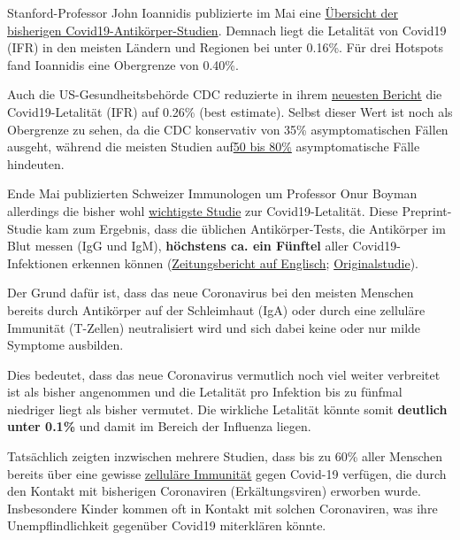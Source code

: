 Stanford-Professor John Ioannidis publizierte im Mai eine
\href{https://swprs.org/studies-on-covid-19-lethality/}{Übersicht der
bisherigen Covid19-Antikörper-Studien}. Demnach liegt die Letalität von
Covid19 (IFR) in den meisten Ländern und Regionen bei unter 0.16\%. Für
drei Hotspots fand Ioannidis eine Obergrenze von 0.40\%.

Auch die US-Gesundheitsbehörde CDC reduzierte in ihrem
\href{https://reason.com/2020/05/24/the-cdcs-new-best-estimate-implies-a-covid-19-infection-fatality-rate-below-0-3/}{neuesten
Bericht} die Covid19-Letalität (IFR) auf 0.26\% (best estimate). Selbst
dieser Wert ist noch als Obergrenze zu sehen, da die CDC konservativ von
35\% asymptomatischen Fällen ausgeht, während die meisten Studien
auf\href{https://www.bmj.com/content/369/bmj.m1375}{50 bis 80\%}
asymptomatische Fälle hindeuten.

Ende Mai publizierten Schweizer Immunologen um Professor Onur Boyman
allerdings die bisher wohl
\href{https://swprs.files.wordpress.com/2020/06/tagesanzeiger-antibody-study-june-2020.pdf}{wichtigste
Studie} zur Covid19-Letalität. Diese Preprint-Studie kam zum Ergebnis,
dass die üblichen Antikörper-Tests, die Antikörper im Blut messen (IgG
und IgM), \textbf{höchstens ca. ein Fünftel} aller Covid19-Infektionen
erkennen können
(\href{https://swprs.org/coronavirus-antibody-tests-show-only-one-fifth-of-infections/}{Zeitungsbericht
auf Englisch};
\href{https://www.biorxiv.org/content/10.1101/2020.05.21.108308v1}{Originalstudie}).

Der Grund dafür ist, dass das neue Coronavirus bei den meisten Menschen
bereits durch Antikörper auf der Schleimhaut (IgA) oder durch eine
zelluläre Immunität (T-Zellen) neutralisiert wird und sich dabei keine
oder nur milde Symptome ausbilden.

Dies bedeutet, dass das neue Coronavirus vermutlich noch viel weiter
verbreitet ist als bisher angenommen und die Letalität pro Infektion bis
zu fünfmal niedriger liegt als bisher vermutet. Die wirkliche Letalität
könnte somit \textbf{deutlich unter 0.1\%} und damit im Bereich der
Influenza liegen.

Tatsächlich zeigten inzwischen mehrere Studien, dass bis zu 60\% aller
Menschen bereits über eine gewisse
\href{https://www.cell.com/cell/fulltext/S0092-8674(20)30610-3}{zelluläre
Immunität} gegen Covid-19 verfügen, die durch den Kontakt mit bisherigen
Coronaviren (Erkältungsviren) erworben wurde. Insbesondere Kinder kommen
oft in Kontakt mit solchen Coronaviren, was ihre Unempflindlichkeit
gegenüber Covid19 miterklären könnte.

